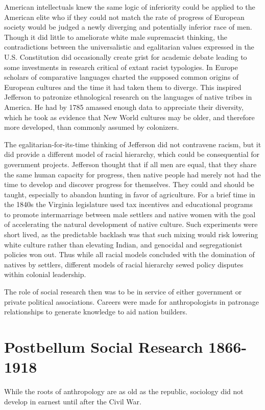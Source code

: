\documentclass[]{book}
\begin{document}
American intellectuals knew the same logic of inferiority could be
applied to the American elite who if they could not match the rate of
progress of European society would be judged a newly diverging and
potentially inferior race of men. Though it did little to ameliorate
white male supremacist thinking, the contradictions between the
universalistic and egalitarian values expressed in the U.S. Constitution
did occasionally create grist for academic debate leading to some
investments in research critical of extant racist typologies. In Europe
scholars of comparative languages charted the supposed common origins of
European cultures and the time it had taken them to diverge. This
inspired Jefferson to patronize ethnological research on the languages
of native tribes in America. He had by 1785 amassed enough data to
appreciate their diversity, which he took as evidence that New World
cultures may be older, and therefore more developed, than commonly
assumed by colonizers.

The egalitarian-for-its-time thinking of Jefferson did not contravene
racism, but it did provide a different model of racial hierarchy, which
could be consequential for government projects. Jefferson thought that
if all men are equal, that they share the same human capacity for
progress, then native people had merely not had the time to develop and
discover progress for themselves. They could and should be taught,
especially to abandon hunting in favor of agriculture. For a brief time
in the 1840s the Virginia legislature used tax incentives and
educational programs to promote intermarriage between male settlers and
native women with the goal of accelerating the natural development of
native culture. \citep[9]{Patterson2001Social} Such experiments were
short lived, as the predictable backlash was that such mixing would risk
lowering white culture rather than elevating Indian, and genocidal and
segregationist policies won out. Thus while all racial models concluded
with the domination of natives by settlers, different models of racial
hierarchy sewed policy disputes within colonial leadership.

The role of social research then was to be in service of either
government or private political associations. Careers were made for
anthropologists in patronage relationships to generate knowledge to aid
nation builders.

\section{Postbellum Social Research
1866-1918}\label{postbellum-social-research-1866-1918}

While the roots of anthropology are as old as the republic, sociology
did not develop in earnest until after the Civil War.


\end{document}
